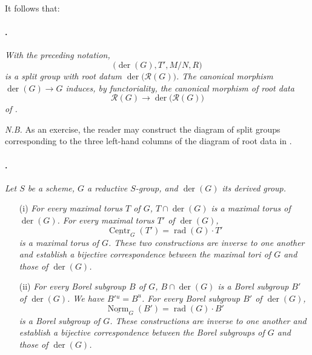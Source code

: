It follows that:

\paragraph{.}
\textit{With the preceding notation,}
\[
  \bigl(\operatorname{der}(G),T',M/N,R\bigr)
\]
\textit{is a split group with root datum
\(\operatorname{der}\bigl(\mathcal R(G)\bigr)\). The canonical
morphism \(\operatorname{der}(G)\to G\) induces, by functoriality,
the canonical morphism of root data}
\[
  \mathcal R(G)\longrightarrow
  \operatorname{der}\bigl(\mathcal R(G)\bigr)
\]
\textit{of .}

\textit{N.B.} As an exercise, the reader may construct the diagram
of split groups corresponding to the three left-hand columns of
the diagram of root data in .

\paragraph{.}
\textit{Let \(S\) be a scheme, \(G\) a reductive \(S\)-group, and
\(\operatorname{der}(G)\) its derived group.}
\begin{enumerate}
\item[\textup{\SGAInlineRefTarget{sga3:xxii:prop:6.2.8:item:i}(i)}]
\textit{For every maximal torus \(T\) of \(G\),
\(T\cap\operatorname{der}(G)\) is a maximal torus of
\(\operatorname{der}(G)\). For every maximal torus \(T'\) of
\(\operatorname{der}(G)\),}
\[
  \underline{\operatorname{Centr}}_G(T')
  =
  \operatorname{rad}(G)\cdot T'
\]
\textit{is a maximal torus of \(G\). These two constructions are
inverse to one another and establish a bijective correspondence
between the maximal tori of \(G\) and those of
\(\operatorname{der}(G)\).}

\item[\textup{\SGAInlineRefTarget{sga3:xxii:prop:6.2.8:item:ii}(ii)}]
\textit{For every Borel subgroup \(B\) of \(G\),
\(B\cap\operatorname{der}(G)\) is a Borel subgroup \(B'\) of
\(\operatorname{der}(G)\). We have \(B'{}^u=B^u\). For every
Borel subgroup \(B'\) of \(\operatorname{der}(G)\),}
\[
  \underline{\operatorname{Norm}}_G(B')
  =
  \operatorname{rad}(G)\cdot B'
\]
\textit{is a Borel subgroup of \(G\). These constructions are
inverse to one another and establish a bijective correspondence
between the Borel subgroups of \(G\) and those of
\(\operatorname{der}(G)\).}
\end{enumerate}

